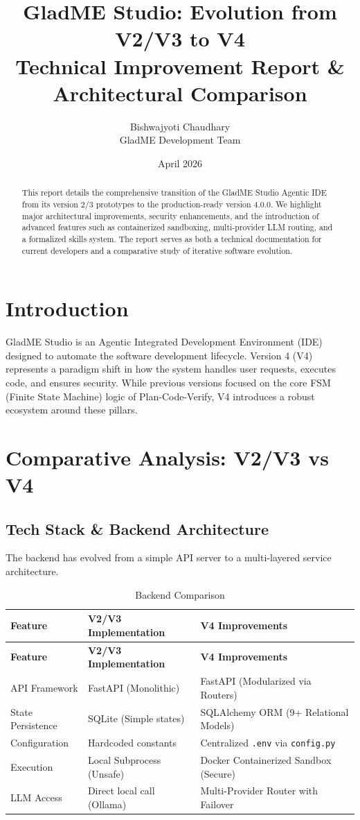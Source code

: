 \documentclass{article}
\title{GladME Studio: Evolution from V2/V3 to V4 \\ \large Technical Improvement Report \& Architectural Comparison}
\author{Bishwajyoti Chaudhary \\ GladME Development Team}
\date{April 2026}
\begin{document}
\maketitle

\begin{abstract}
This report details the comprehensive transition of the GladME Studio Agentic IDE from its version 2/3 prototypes to the production-ready version 4.0.0. We highlight major architectural improvements, security enhancements, and the introduction of advanced features such as containerized sandboxing, multi-provider LLM routing, and a formalized skills system. The report serves as both a technical documentation for current developers and a comparative study of iterative software evolution.
\end{abstract}

\section{Introduction}
GladME Studio is an Agentic Integrated Development Environment (IDE) designed to automate the software development lifecycle. Version 4 (V4) represents a paradigm shift in how the system handles user requests, executes code, and ensures security. While previous versions focused on the core FSM (Finite State Machine) logic of Plan-Code-Verify, V4 introduces a robust ecosystem around these pillars.

\section{Comparative Analysis: V2/V3 vs V4}

\subsection{Tech Stack \& Backend Architecture}
The backend has evolved from a simple API server to a multi-layered service architecture.

\begin{longtable}{@{}p{}p{}p{}@{}}
\caption{Backend Comparison} \\
\toprule
\textbf{Feature} & \textbf{V2/V3 Implementation} & \textbf{V4 Improvements} \\ \midrule
\endfirsthead
\toprule
\textbf{Feature} & \textbf{V2/V3 Implementation} & \textbf{V4 Improvements} \\ \midrule
\endhead
\bottomrule
\endfoot
API Framework & FastAPI (Monolithic) & FastAPI (Modularized via Routers) \\
State Persistence & SQLite (Simple states) & SQLAlchemy ORM (9+ Relational Models) \\
Configuration & Hardcoded constants & Centralized \texttt{.env} via \texttt{config.py} \\
Execution & Local Subprocess (Unsafe) & Docker Containerized Sandbox (Secure) \\
LLM Access & Direct local call (Ollama) & Multi-Provider Router with Failover \\
\bottomrule
\end{longtable}
\end{document}
